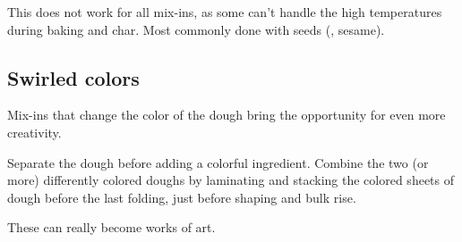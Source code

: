 This does not work for all mix-ins, as some can't handle the high temperatures
during baking and char. Most commonly done with seeds (\eg, sesame).

\subsection{Swirled colors}
Mix-ins that change the color of the dough bring the opportunity for even more
creativity.

Separate the dough before adding a colorful ingredient. Combine the two (or
more) differently colored doughs by laminating and stacking the colored sheets
of dough before the last folding, just before shaping and bulk rise.

These can really become works of art.

